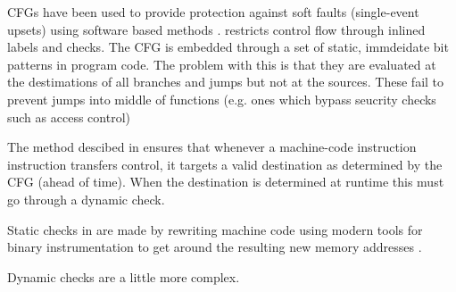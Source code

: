 CFGs have been used to provide protection against soft faults (single-event upsets) using software based methods \cite{40,45,57}. 
\cite{40} restricts control flow through inlined labels and checks. The CFG is embedded through a set of static, immdeidate bit patterns in program code. The problem with this is that they are evaluated at the destimations of all branches and jumps but not at the sources. These fail to prevent jumps into middle of functions (e.g. ones which bypass seucrity checks such as access control)

The method descibed in \cite{Abadi2005} ensures that whenever a machine-code instruction instruction transfers control, it targets a valid destination as determined by the CFG (ahead of time). When the destination is determined at runtime this must go through a dynamic check.

Static checks in \cite{Abadi2005} are made by rewriting machine code using modern tools for binary instrumentation to get around the resulting new memory addresses \cite{52,53}.

Dynamic checks are a little more complex. 